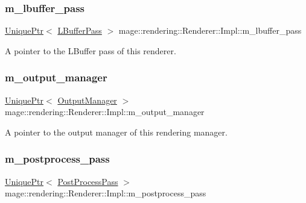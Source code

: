 \subsubsection{\texorpdfstring{m\+\_\+lbuffer\+\_\+pass}{m\_lbuffer\_pass}}
{\footnotesize\ttfamily \mbox{\hyperlink{namespacemage_a3316d7143a973e37adf1110f2e80ca31}{Unique\+Ptr}}$<$ \mbox{\hyperlink{classmage_1_1rendering_1_1_l_buffer_pass}{L\+Buffer\+Pass}} $>$ mage\+::rendering\+::\+Renderer\+::\+Impl\+::m\+\_\+lbuffer\+\_\+pass\hspace{0.3cm}{\ttfamily [private]}}

A pointer to the L\+Buffer pass of this renderer. \mbox{\label{classmage_1_1rendering_1_1_renderer_1_1_impl_a177cc2fc2cab6c39fc26046e1bea8b97}} 
\subsubsection{\texorpdfstring{m\+\_\+output\+\_\+manager}{m\_output\_manager}}
{\footnotesize\ttfamily \mbox{\hyperlink{namespacemage_a3316d7143a973e37adf1110f2e80ca31}{Unique\+Ptr}}$<$ \mbox{\hyperlink{classmage_1_1rendering_1_1_output_manager}{Output\+Manager}} $>$ mage\+::rendering\+::\+Renderer\+::\+Impl\+::m\+\_\+output\+\_\+manager\hspace{0.3cm}{\ttfamily [private]}}

A pointer to the output manager of this rendering manager. \mbox{\label{classmage_1_1rendering_1_1_renderer_1_1_impl_a243257571f0f32cdc401b73d9b39587c}} 
\subsubsection{\texorpdfstring{m\+\_\+postprocess\+\_\+pass}{m\_postprocess\_pass}}
{\footnotesize\ttfamily \mbox{\hyperlink{namespacemage_a3316d7143a973e37adf1110f2e80ca31}{Unique\+Ptr}}$<$ \mbox{\hyperlink{classmage_1_1rendering_1_1_post_process_pass}{Post\+Process\+Pass}} $>$ mage\+::rendering\+::\+Renderer\+::\+Impl\+::m\+\_\+postprocess\+\_\+pass\hspace{0.3cm}{\ttfamily [private]}}

